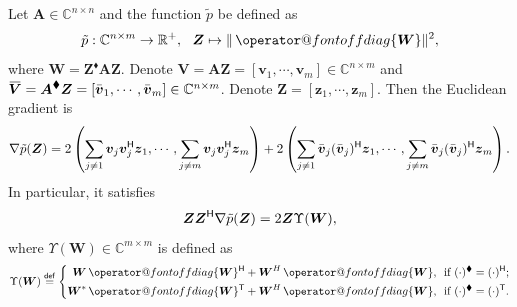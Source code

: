 \documentclass[final,onefignum,onetabnum]{siamart190516}
\makeatletter
\newcommand{\overbar}[1]{\mkern 1.5mu\overline{\mkern-1.5mu#1\mkern-1.5mu}\mkern 1.5mu}
\newcommand{\matr}[1]{\boldsymbol{#1}}
\newcommand{\vect}[1]{\boldsymbol{#1}}
\newcommand{\T}{{\sf T}} %
\renewcommand{\H}{{\sf H}} %
\newcommand{\offdiag}[1]{\mathop{\operator@font offdiag}\{#1\}} %
\newcommand{\eqdef}{\stackrel{\sf def}{=}}
\newcommand{\RR}{\mathbb{R}}
\newcommand{\CC}{\mathbb{C}}
\renewcommand{\H}{{\sf H}}      %
\renewcommand{\TH}{{\blacklozenge}}
\makeatother
\begin{document}
\begin{lemma}\label{lemm:euclid_grad_gener}
Let $\matr{A}\in\CC^{n\times n}$ and the function $\tilde{p}$ be defined as
\begin{equation*}
\tilde{p}: \CC^{n\times m}\rightarrow\RR^{+},\ \ \matr{Z}\mapsto  \|\offdiag{\matr{W}}\|^2,
\end{equation*}
where $\matr{W}=\matr{Z}^{\TH}\matr{A}\matr{Z}$. 
Denote $\matr{V}=\matr{A}\matr{Z}=[\vect{v}_1,\cdots,\vect{v}_m]\in\CC^{n\times m}$ and $\overbar{\matr{V}}=\matr{A}^{\TH}\matr{Z}=[\bar{\vect{v}}_1,\cdots,\bar{\vect{v}}_m]\in\CC^{n\times m}$. 
Denote $\matr{Z}=[\vect{z}_1,\cdots,\vect{z}_m]$. 
Then the Euclidean gradient is
\begin{align*}
\nabla\tilde{p}(\matr{Z})  = 2\left(\sum_{j\neq 1}\vect{v}_{j}\vect{v}_{j}^{\H}\vect{z}_1,\cdots,\sum_{j\neq m}\vect{v}_{j}\vect{v}_{j}^{\H}\vect{z}_m\right)+
2\left(\sum_{j\neq 1}\bar{\vect{v}}_{j}(\bar{\vect{v}}_{j})^{\H}\vect{z}_1,\cdots,\sum_{j\neq m}\bar{\vect{v}}_{j}(\bar{\vect{v}}_{j})^{\H}\vect{z}_m\right).
\end{align*}
In particular, it satisfies 
\begin{align}\label{eq:eucli_grad_h}
\matr{Z}\matr{Z}^{\H}\nabla\tilde{p}(\matr{Z})   = 2\matr{Z}\Upsilon(\matr{W}),
\end{align}
where $\Upsilon(\matr{W})\in\CC^{m\times m}$ is defined as 
\begin{equation}\label{eq:Upsilon_W}
\Upsilon(\matr{W})\eqdef\left\{
\begin{aligned}
\matr{W}\offdiag{\matr{W}}^{\H} + \matr{W}^{H}\offdiag{\matr{W}},\ \ & \textrm{if}\  (\cdot)^{\TH}=(\cdot)^{\H}; \\
\matr{W}^{*}\offdiag{\matr{W}}^{\T} + \matr{W}^{H}\offdiag{\matr{W}},\ \ & \textrm{if}\  (\cdot)^{\TH}=(\cdot)^{\T}.
\end{aligned}
\right.
\end{equation}
\end{lemma}
\end{document}
